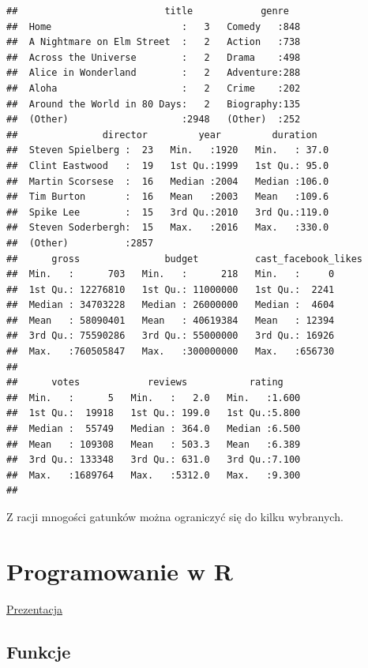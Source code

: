 \documentclass[]{book}
\begin{document}
\begin{verbatim}
##                          title            genre    
##  Home                       :   3   Comedy   :848  
##  A Nightmare on Elm Street  :   2   Action   :738  
##  Across the Universe        :   2   Drama    :498  
##  Alice in Wonderland        :   2   Adventure:288  
##  Aloha                      :   2   Crime    :202  
##  Around the World in 80 Days:   2   Biography:135  
##  (Other)                    :2948   (Other)  :252  
##               director         year         duration    
##  Steven Spielberg :  23   Min.   :1920   Min.   : 37.0  
##  Clint Eastwood   :  19   1st Qu.:1999   1st Qu.: 95.0  
##  Martin Scorsese  :  16   Median :2004   Median :106.0  
##  Tim Burton       :  16   Mean   :2003   Mean   :109.6  
##  Spike Lee        :  15   3rd Qu.:2010   3rd Qu.:119.0  
##  Steven Soderbergh:  15   Max.   :2016   Max.   :330.0  
##  (Other)          :2857                                 
##      gross               budget          cast_facebook_likes
##  Min.   :      703   Min.   :      218   Min.   :     0     
##  1st Qu.: 12276810   1st Qu.: 11000000   1st Qu.:  2241     
##  Median : 34703228   Median : 26000000   Median :  4604     
##  Mean   : 58090401   Mean   : 40619384   Mean   : 12394     
##  3rd Qu.: 75590286   3rd Qu.: 55000000   3rd Qu.: 16926     
##  Max.   :760505847   Max.   :300000000   Max.   :656730     
##                                                             
##      votes            reviews           rating     
##  Min.   :      5   Min.   :   2.0   Min.   :1.600  
##  1st Qu.:  19918   1st Qu.: 199.0   1st Qu.:5.800  
##  Median :  55749   Median : 364.0   Median :6.500  
##  Mean   : 109308   Mean   : 503.3   Mean   :6.389  
##  3rd Qu.: 133348   3rd Qu.: 631.0   3rd Qu.:7.100  
##  Max.   :1689764   Max.   :5312.0   Max.   :9.300  
## 
\end{verbatim}

Z racji mnogości gatunków można ograniczyć się do kilku wybranych.

\chapter{Programowanie w R}\label{programowanie-w-r}

\href{presentations/ppr20190427.html}{Prezentacja}

\section{Funkcje}\label{funkcje}
\end{document}
